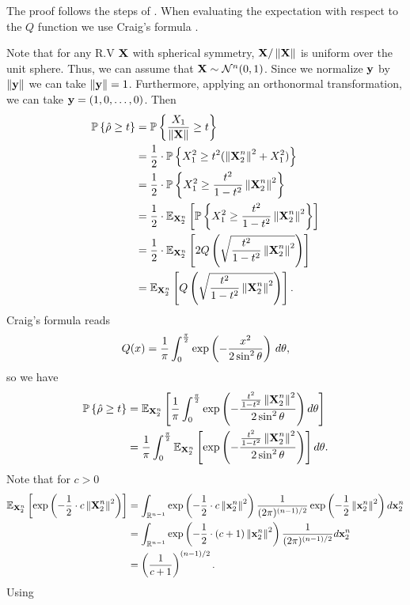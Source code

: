 The proof follows the steps of \cite[Lemma 4]{lomnitz2011communication}.  When evaluating the expectation with respect to the $Q$ function we use Craig's formula \cite{craig1991new}.

Note that for any R.V $\textbf{X}$ with spherical symmetry, $\textbf{X}/\left\Vert \textbf{X} \right\Vert$ is uniform over the unit sphere.  Thus, we can assume that $\textbf{X} \sim \mathcal{N}^n(0,1)$.  Since we normalize $\mathbf{y}$ by $\left\Vert \mathbf{y} \right\Vert$ we can take $\left\Vert \mathbf{y} \right\Vert=1$.  Furthermore, applying an orthonormal transformation, we can take $\mathbf{y}=\left( 1,0,\dots,0 \right)$.  Then
\begin{align*}
	\mathbb{P}\left\{ \hat\rho \geq t \right\}  &= \mathbb{P}\left\{  \frac{X_1}{\left\Vert \textbf{X} \right\Vert} \geq t \right\}\\
	&=\frac12\cdot\mathbb{P}\left\{  X_1^2 \geq t^2 (\left\Vert \textbf{X}_2^n \right\Vert^2 + X_1^2)  \right\} \\
	&=\frac12\cdot\mathbb{P}\left\{  X_1^2 \geq \frac{t^2}{1-t^2} \left\Vert \textbf{X}_2^n \right\Vert^2   \right\}\\
	&=\frac12\cdot\mathbb{E}_{\textbf{X}_2^n} \left[  \mathbb{P}\left\{  X_1^2 \geq \frac{t^2}{1-t^2} \left\Vert \textbf{X}_2^n \right\Vert^2  \right\}  \right]\\
	&=\frac12\cdot\mathbb{E}_{\textbf{X}_2^n} \left[  2 Q \left(  \sqrt {\frac{t^2}{1-t^2} \left\Vert \textbf{X}_2^n \right\Vert^2  }  \right)  \right] \\
	&=\mathbb{E}_{\textbf{X}_2^n} \left[  Q \left(  \sqrt {\frac{t^2}{1-t^2} \left\Vert \textbf{X}_2^n \right\Vert^2  }  \right)  \right].
\end{align*}
Craig's formula \cite{craig1991new} reads
\begin{equation*}
	Q(x) = \frac{1}{\pi}\int_{0}^{\frac \pi 2} \exp \left( -\frac{x^2}{2\sin^2 \theta} \right)\,d \theta,
\end{equation*}
so we have
\begin{align*}
	\mathbb{P}\left\{ \hat\rho \geq t \right\}  &=\mathbb{E}_{\textbf{X}_2^n} \left[  \frac{1}{\pi}\int_{0}^{\frac \pi 2} \exp \left( -\frac{{\frac{t^2}{1-t^2} \left\Vert \textbf{X}_2^n \right\Vert^2  }}{2\sin^2 \theta} \right)d \theta   \right] \\
	&=\frac{1}{\pi} \int_{0}^{\frac \pi 2} \mathbb{E}_{\textbf{X}_2^n} \left[  \exp \left( -\frac{ \frac{t^2}{1-t^2} \left\Vert \textbf{X}_2^n \right\Vert^2  } {2\sin^2 \theta} \right)   \right] d \theta.
\end{align*}
Note that for $c > 0$
\begin{align*}
	\mathbb{E}_{\textbf{X}_2^n} \left[  \exp \left( -\frac12\cdot c\left\Vert \textbf{X}_2^n \right\Vert^2   \right)   \right] &=\int_{\mathbb{R}^{n-1}} \exp \left( -\frac12\cdot c\left\Vert \mathbf{x}_2^n \right\Vert^2   \right) \frac{1}{(2 \pi)^{(n-1)/2}} \exp\left( - \frac12 \left\Vert \mathbf{x}_2^n \right\Vert^2 \right) d \mathbf{x}_2^n \\
	&=\int_{\mathbb{R}^{n-1}} \exp \left( -\frac12\cdot (c+1)\left\Vert \mathbf{x}_2^n \right\Vert^2   \right) \frac{1}{(2 \pi)^{(n-1)/2}} d \mathbf{x}_2^n \\
	&=\left( 1 \over c+1 \right)^{(n-1)/2}.
\end{align*}
Using
